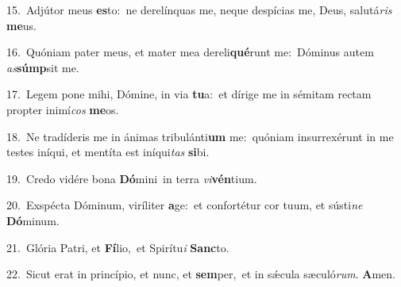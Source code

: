 {\numbfont\textcolor{\numbcolor}{15.}}~Adjútor meus \textbf{es}\-to:~\star ne derelínquas me, neque despícias me, Deus, salutá\textit{ris} \textbf{me}\-us.\par
{\numbfont\textcolor{\numbcolor}{16.}}~Quóniam pater meus, et mater mea dereli\-\textbf{qué}\-runt me:~\star Dóminus autem \textit{as}\-\textbf{súmp}sit me.\par
{\numbfont\textcolor{\numbcolor}{17.}}~Legem pone mihi, Dómine, in via \textbf{tu}\-a:~\star et dírige me in sémitam rectam propter inimí\textit{cos} \textbf{me}\-os.\par
{\numbfont\textcolor{\numbcolor}{18.}}~Ne tradíderis me in ánimas tribulánti\textbf{um} me:~\star quóniam insurrexérunt in me testes iníqui, et mentíta est iníqui\textit{tas} \textbf{si}\-bi.\par
{\numbfont\textcolor{\numbcolor}{19.}}~Credo vidére bona \textbf{Dó}\-mini~\star in terra \textit{vi}\-\textbf{vén}tium.\par
{\numbfont\textcolor{\numbcolor}{20.}}~Exspécta Dóminum, viríliter \textbf{a}\-ge:~\star et confortétur cor tuum, et sústi\textit{ne} \textbf{Dó}\-minum.\par
{\numbfont\textcolor{\numbcolor}{21.}}~Glória Patri, et \textbf{Fí}\-lio,~\star et Spirítu\textit{i} \textbf{Sanc}\-to.\par
{\numbfont\textcolor{\numbcolor}{22.}}~Sicut erat in princípio, et nunc, et \textbf{sem}\-per,~\star et in sǽcula sæculó\-\textit{rum}\-. \textbf{A}\-men.\par
